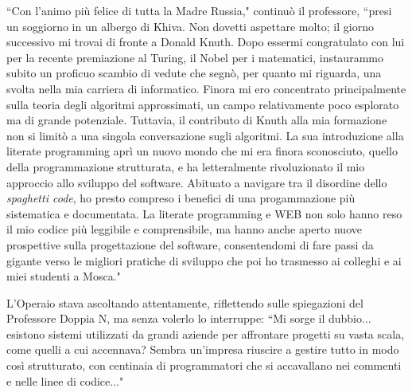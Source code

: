 \documentclass[12pt,b5paper]{article}
\begin{document}
``Con l'animo più felice di tutta la Madre Russia," continuò il professore,
``presi un soggiorno in un albergo di Khiva. Non dovetti aspettare molto; il
giorno successivo mi trovai di fronte a Donald Knuth. Dopo essermi congratulato
con lui per la recente premiazione al Turing, il Nobel per i matematici,
instaurammo subito un proficuo scambio di vedute che segnò, per quanto mi
riguarda, una svolta nella mia carriera di informatico. Finora mi ero concentrato
principalmente sulla teoria degli algoritmi approssimati, un campo relativamente
poco esplorato ma di grande potenziale. Tuttavia, il contributo di Knuth alla
mia formazione non si limitò a una singola conversazione sugli algoritmi. La
sua introduzione alla literate programming aprì un nuovo mondo che mi era finora
sconosciuto, quello della programmazione strutturata, e ha letteralmente
rivoluzionato  il mio approccio allo sviluppo del software. Abituato a navigare
tra il disordine dello \textit{spaghetti code}, ho presto compreso i benefici di una
progammazione più sistematica e documentata. La literate programming e WEB non
solo hanno reso il mio codice più leggibile e comprensibile, ma hanno anche
aperto nuove prospettive sulla progettazione del software, consentendomi di
fare passi da gigante verso le migliori pratiche di sviluppo che poi ho
trasmesso ai colleghi e ai miei studenti a Mosca."

L'Operaio stava ascoltando attentamente, riflettendo sulle spiegazioni del
Professore Doppia N, ma senza volerlo lo interruppe: ``Mi sorge il dubbio...
esistono sistemi utilizzati da grandi aziende per affrontare progetti su vasta
scala, come quelli a cui accennava? Sembra un'impresa riuscire a gestire tutto
in modo così strutturato, con centinaia di programmatori che si accavallano nei
commenti e nelle linee di codice..."
\end{document}
